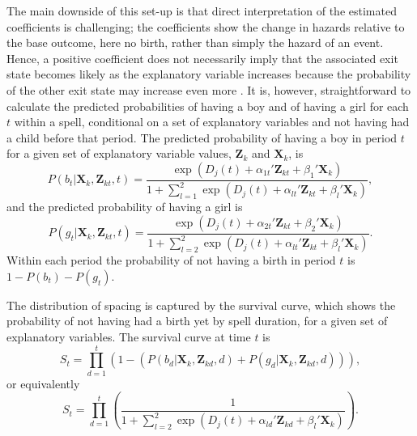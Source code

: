 \documentclass[12pt,letterpaper]{article}
\begin{document}
The main downside of this set-up is that direct interpretation of the estimated 
coefficients is challenging;
the coefficients show the change in hazards relative to the base outcome, 
here no birth, rather than simply the hazard of an event.
Hence, a positive coefficient does not necessarily imply that the associated 
exit state becomes likely as the explanatory variable increases because the 
probability of the other exit state may increase even more \citep{thomas96}.
It is, however, straightforward to calculate the predicted probabilities of 
having a boy and of having a girl for each $t$ within a spell, conditional on 
a set of explanatory variables and not having had a child before that period.
The predicted probability of having a boy in period $t$ for a given set of 
explanatory variable values, $\mathbf{Z}_k$ and $\mathbf{X}_k$, is
\begin{equation}
P(b_{t} | \mathbf{X}_{k}, \mathbf{Z}_{kt}, t ) 
=  
\frac{ \exp(D_j(t) + \alpha_{1t}' \mathbf{Z}_{kt} + \beta_1' \mathbf{X}_{k} )}
{1 + \sum_{l=1}^2 \exp(D_j(t) + \alpha_{lt} ' \mathbf{Z}_{kt} + \beta_l ' \mathbf{X}_{k})},
\label{eq:probability_boy}
\end{equation}
and the predicted probability of having a girl is
\begin{equation}
P(g_{t} | \mathbf{X}_{k}, \mathbf{Z}_{kt},t ) 
=  
\frac{ \exp(D_j(t) + \alpha_{2t}'\mathbf{Z}_{kt} + \beta_2'\mathbf{X}_{k} )}
{1 + \sum_{l=2}^2 \exp(D_j(t) + \alpha_{lt}'\mathbf{Z}_{kt} + \beta_l'\mathbf{X}_{k})}.
\label{eq:probability_girl}
\end{equation}
Within each period the probability of not having a birth in period $t$
is $1-P(b_{t})-P(g_{t})$.

The distribution of spacing is captured by the survival curve, which shows 
the probability of not having had a birth yet by spell duration, for
a given set of explanatory variables.
The survival curve at time $t$ is 
\begin{equation}
S_{t} 
= 
\prod_{d=1}^t 
\left( 
	1- \left(P(b_{d} | \mathbf{X}_{k}, \mathbf{Z}_{kd}, d) 
	+ P(g_{d} | \mathbf{X}_{k}, \mathbf{Z}_{kd}, d) \right) 
\right),
 \label{eq:survival}
\end{equation}
or equivalently
\begin{equation}
S_{t} 
= 
\prod_{d=1}^t
\left(
\frac{ 1 }
{1 + \sum_{l=2}^2 \exp(D_j(t) + \alpha_{ld}'\mathbf{Z}_{kd} + \beta_l'\mathbf{X}_{k})}
\right).
\end{equation}
\end{document}
